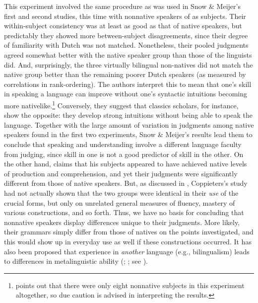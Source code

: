 This experiment involved the same procedure as was used in Snow \& Meijer's first and second studies, this time with nonnative speakers of  as subjects. Their within-subject consistency was at least as good as that of native speakers, but predictably they showed more between-subject disagreements, since their degree of familiarity with Dutch was not matched. Nonetheless, their pooled judgments agreed somewhat better with the native speaker group than those of the linguists did. And, surprisingly, the three virtually bilingual non-natives did not match the native group better than the remaining poorer Dutch speakers (as measured by correlations in rank-ordering). The authors interpret this to mean that one's skill in speaking a language can improve without one's syntactic intuitions becoming more nativelike.\footnote{\citet{Chaudron1983} points out that there were only eight nonnative subjects in this experiment altogether, so due caution is advised in interpreting the results.}
 Conversely, they suggest that classics scholars, for instance, show the opposite: they develop strong intuitions without being able to speak the language. Together with the large amount of variation in judgments among native speakers found in the first two experiments, Snow \& Meijer's results lead them to conclude that speaking and understanding involve a different language faculty from judging, since skill in one is not a good predictor of skill in the other. On the other hand, \citet{Coppieters1987} claims that his subjects appeared to have achieved native levels of production and comprehension, and yet their judgments were significantly different from those of native speakers. But, as discussed in , Coppieters's study had not actually shown that the two groups were identical in their \textit{use} of the crucial forms, but only on unrelated general measures of fluency, mastery of various constructions, and so forth. Thus, we have no basis for concluding that nonnative speakers display differences unique to their judgments. More likely, their grammars simply differ from those of natives on the points investigated, and this would show up in everyday use as well if these constructions occurred. It has also been proposed that experience in \textit{another} language (e.g., bilingualism) leads to differences in metalinguistic ability (\citealt{VanKleeck1982}; \citealt{Bialystok1986}; see ).

